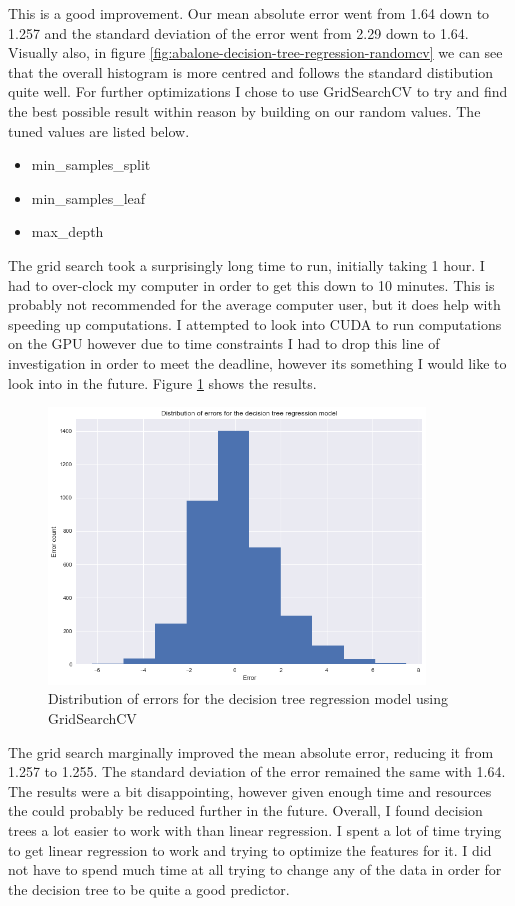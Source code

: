 This is a good improvement. Our mean absolute error went from 1.64 down to 1.257 and the standard deviation of the error went from 2.29 down to 1.64. Visually also, in figure \ref{fig:abalone-decision-tree-regression-randomcv} we can see that the overall histogram is more centred and follows the standard distibution quite well. 
For further optimizations I chose to use GridSearchCV to try and find the best possible result within reason by building on our random values. The tuned values are listed below.

\begin{itemize}
  \item min\_samples\_split
  \item min\_samples\_leaf
  \item max\_depth
\end{itemize}

The grid search took a surprisingly long time to run, initially taking 1 hour. I had to over-clock my computer in order to get this down to 10 minutes. This is probably not recommended for the average computer user, but it does help with speeding up computations. I attempted to look into CUDA to run computations on the GPU\cite{6024507} however due to time constraints I had to drop this line of investigation in order to meet the deadline, however its something I would like to look into in the future. Figure \ref{fig:abalone-decision-tree-regression-gridcv} shows the results. 

\begin{figure}[H]
  \centering
  \includegraphics[scale=0.5,width=100mm]{./images/abalone-decision-tree-regression-gridcv.png}
  \caption{Distribution of errors for the decision tree regression model using GridSearchCV}
  \label{fig:abalone-decision-tree-regression-gridcv}
\end{figure}

The grid search marginally improved the mean absolute error, reducing it from 1.257 to 1.255. The standard deviation of the error remained the same with 1.64. The results were a bit disappointing, however given enough time and resources the could probably be reduced further in the future.
Overall, I found decision trees a lot easier to work with than linear regression. I spent a lot of time trying to get linear regression to work and trying to optimize the features for it. I did not have to spend much time at all trying to change any of the data in order for the decision tree to be quite a good predictor.